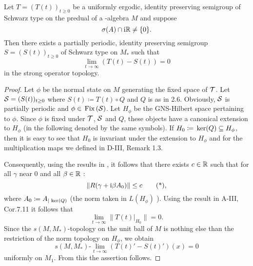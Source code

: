 \begin{theorem}\label{thm:d4-3.11}
Let $ T = (T(t))_{t \geq 0} $  be a uniformly ergodic, identity preserving semigroup of Schwarz type on the predual of a \WA-algebra $ M $  and suppose 
%
\[
	\sigma(A) \cap \mathrm{i}\mathbb{R} \neq \{0\} .
\]
%
Then there exists a partially periodic, identity preserving semigroup $ S = (S(t))_{t \geq 0} $  of Schwarz type on $ M_{*} $  such that
\[
\lim_{t \to \infty} (T(t) - S(t)) = 0
\]
in the strong operator topology.
\end{theorem}
\begin{proof}
Let $ \phi $  be the normal state on $ M $  generating the fixed space of $ \mathcal{T} $.
Let $ \mathcal{S} = (S(t))_{t \geq 0} $  where $ S(t) \coloneqq T(t) \circ Q $  and $ Q $  is as in 2.6.
Obviously, $ \mathcal{S} $  is partially periodic and $ \phi \in \mathop{}\mathrm{Fix}\left(\mathcal{S}\right) $.
Let $ H_{\phi} $  be the GNS-Hilbert space pertaining to $ \phi $.
Since $ \phi $  is fixed under $ \mathcal{T} $, $ \mathcal{S} $  and $ Q $,  these objects have a canonical extension to $ H_{\phi} $  (in the following denoted by the same symbols).
If $ H_{0} \coloneqq \mathop{}\mathrm{ker}(Q) \subseteq H_{\phi} $,  then it is easy to see that $ H_{0} $  is invariant under the extension to $ H_{\phi} $  and for the multiplication maps we defined in D-III, Remark 1.3.

Consequently, using the results in \citet{grohkuemmerer:1982}, it follows that there exists $ c \in \mathbb{R} $  such that for all $ \gamma $  near $ 0 $  and all $ \beta \in \mathbb{R} $ :
\begin{equation}
\|R(\gamma + \mathrm{i}\beta A_{0})\| \leq c \tag{*} ,
\end{equation}
where $ A_{0} \coloneqq A_{|\mathop{}\mathrm{ker}(Q)} $  (the norm taken in $ L(H_{\phi}) $ ).
Using the result in A-III, Cor.7.11 it follows that
\[
\lim_{t \to \infty} \|T(t)|_{H_{0}}\| = 0.
\]
Since the $ s(M,M_{*}) $-topology on the unit ball of $ M $  is nothing else than the restriction of the norm topology on $ H_{\phi} $, we obtain
\[
s(M,M_{*})\text{-}\lim_{t \to \infty} (T(t)' - S(t)')(x) = 0
\]
uniformly on $ M_{1} $.
From this the assertion follows.
\end{proof}
